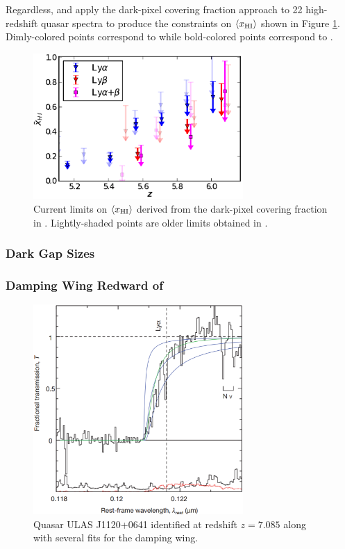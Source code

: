 Regardless, \cite{McGreer:2011dm} and \cite{McGreer:2014qwa} apply the dark-pixel covering fraction approach to 22 high-redshift quasar spectra to produce the constraints on $\langle x_{\text{HI}}\rangle$ shown in Figure \ref{fig:McGreer}. Dimly-colored points correspond to \cite{McGreer:2011dm} while bold-colored points correspond to \cite{McGreer:2014qwa}. 

\begin{figure}[h]
  \centering
  \includegraphics[width=8cm]{xhi_newdata.eps}
  \caption{Current limits on $\langle x_{\text{HI}}\rangle$ derived from the dark-pixel covering fraction in \cite{McGreer:2014qwa}. Lightly-shaded points are older limits obtained in \cite{McGreer:2011:dm}.}
  \label{fig:McGreer}
\end{figure}


\subsubsection{Dark Gap Sizes}
\subsubsection{Damping Wing Redward of \lya}

\begin{figure}[h]
  \centering
  \includegraphics[width=8cm]{z7p085_DampingWing.eps}
  \caption{Quasar ULAS J1120+0641 identified at redshift $z = 7.085$ along with several fits for the damping wing.}
  \label{fig:Chornock}
\end{figure}



